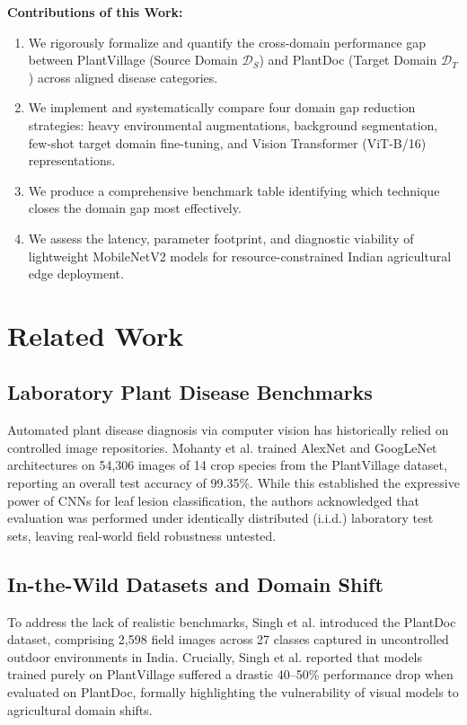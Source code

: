 \documentclass[twoside,a4paper,11pt]{article}
\begin{document}
\textbf{Contributions of this Work:}
\begin{enumerate}
    \item We rigorously formalize and quantify the cross-domain performance gap between PlantVillage (Source Domain $\mathcal{D}_S$) and PlantDoc (Target Domain $\mathcal{D}_T$) across aligned disease categories.
    \item We implement and systematically compare four domain gap reduction strategies: heavy environmental augmentations, background segmentation, few-shot target domain fine-tuning, and Vision Transformer (ViT-B/16) representations.
    \item We produce a comprehensive benchmark table identifying which technique closes the domain gap most effectively.
    \item We assess the latency, parameter footprint, and diagnostic viability of lightweight MobileNetV2 models for resource-constrained Indian agricultural edge deployment.
\end{enumerate}

\section{Related Work}

\subsection{Laboratory Plant Disease Benchmarks}
Automated plant disease diagnosis via computer vision has historically relied on controlled image repositories. Mohanty et al. \cite{Mohanty:16} trained AlexNet and GoogLeNet architectures on 54,306 images of 14 crop species from the PlantVillage dataset, reporting an overall test accuracy of 99.35\%. While this established the expressive power of CNNs for leaf lesion classification, the authors acknowledged that evaluation was performed under identically distributed (i.i.d.) laboratory test sets, leaving real-world field robustness untested.

\subsection{In-the-Wild Datasets and Domain Shift}
To address the lack of realistic benchmarks, Singh et al. \cite{Singh:20} introduced the PlantDoc dataset, comprising 2,598 field images across 27 classes captured in uncontrolled outdoor environments in India. Crucially, Singh et al. reported that models trained purely on PlantVillage suffered a drastic 40--50\% performance drop when evaluated on PlantDoc, formally highlighting the vulnerability of visual models to agricultural domain shifts.
\end{document}

